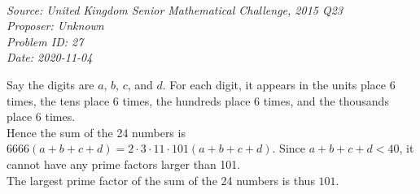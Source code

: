 \SSbreak\\
\emph{Source: United Kingdom Senior Mathematical Challenge, 2015 Q23}\\
\emph{Proposer: Unknown}\\
\emph{Problem ID: 27}\\
\emph{Date: 2020-11-04}\\
\SSbreak

\bigskip

\begin{solution}\hfil\medskip 

    Say the digits are $a$, $b$, $c$, and $d$. For each digit, it appears in the units place 6 times, the tens place 6 times, the hundreds place 6 times, and the thousands place 6 times. \\

    Hence the sum of the 24 numbers is $6666(a+b+c+d) = 2 \cdot 3 \cdot 11 \cdot 101 (a+b+c+d)$. Since $a+b+c+d < 40$, it cannot have any prime factors larger than 101. \\

    The largest prime factor of the sum of the 24 numbers is thus $\boxed{101}$. 
\end{solution}\bigskip